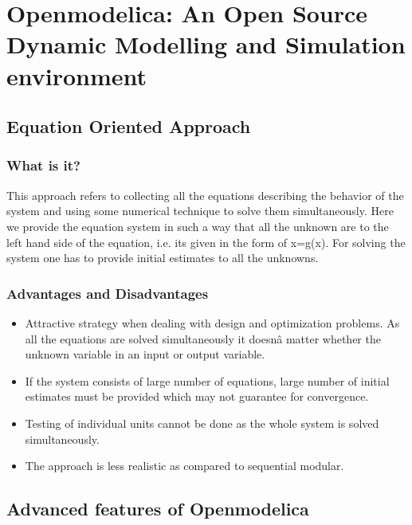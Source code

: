 \documentclass[12pt]{report}
\begin{document}
\chapter{Openmodelica: An Open Source Dynamic Modelling and Simulation environment}

\section{Equation Oriented Approach}
\subsection{What is it?}
This approach refers to collecting all the equations describing the behavior of the system and using some numerical technique to solve them simultaneously. Here we provide the equation system in such a way that all the unknown are to the left hand side of the equation, i.e. its given in the form of x=g(x). For solving the system one has to provide initial estimates to all the unknowns.

\subsection{Advantages and Disadvantages}
\begin{itemize}
\item {Attractive strategy when dealing with design and optimization problems. As all the equations are solved simultaneously it doesnâ  matter whether the unknown variable in an input or output variable.}
\item{If the system consists of large number of equations, large number of initial estimates must be provided which may not guarantee for convergence.}
\item{Testing of individual units cannot be done as the whole system is solved simultaneously.}
\item{The approach is less realistic as compared to sequential modular.}
\end{itemize}


\section{Advanced features of Openmodelica}
\end{document}
